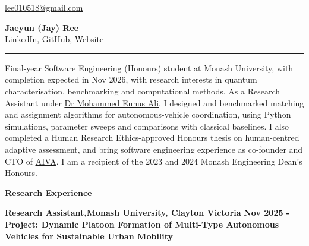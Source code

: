 \documentclass[11pt, a4paper]{article}
\let\hrefnoul\href
\renewcommand{\href}[2]{\hrefnoul{#1}{\ul{#2}}}
\newcommand{\resumesection}[1]{%
  \vspace{6pt}\par
  {\setlength{\fboxsep}{5pt}%
   \noindent\colorbox{sectionbg}{%
     \parbox{\dimexpr\linewidth-10pt\relax}{\strut\textbf{\large #1}\strut}%
   }}%
  \vspace{2pt}\par
}
\begin{document}

\noindent
\begin{minipage}[c]{0.25\textwidth}
  \href{mailto:lee010518@gmail.com}{lee010518@gmail.com}
\end{minipage}%
\begin{minipage}[c]{0.50\textwidth}
  \centering
  {\fontsize{26}{30}\selectfont\textbf{Jaeyun (Jay) Ree}}\\[3pt]
  \href{https://www.linkedin.com/in/jaeyun-ree-75b17b26b/}{LinkedIn},%
  \href{https://github.com/JayReeMarine/}{GitHub},%
  \href{https://jaeyunree.com/}{Website}%
\end{minipage}%
\begin{minipage}[c]{0.25\textwidth}
\end{minipage}

\vspace{4pt}
{\color{linkblue}\rule{\linewidth}{1.2pt}}
\vspace{2pt}

Final-year Software Engineering (Honours) student at Monash University, with completion expected in Nov 2026, with research interests in quantum characterisation, benchmarking and computational methods. As a Research Assistant under \href{https://research.monash.edu/en/persons/eunus-ali}{Dr Mohammed Eunus Ali}, I designed and benchmarked matching and assignment algorithms for autonomous-vehicle coordination, using Python simulations, parameter sweeps and comparisons with classical baselines. I also completed a Human Research Ethics-approved Honours thesis on human-centred adaptive assessment, and bring software engineering experience as co-founder and CTO of \href{https://github.com/AIVA-MVP}{AIVA}. I am a recipient of the 2023 and 2024 Monash Engineering Dean's Honours.

\resumesection{Research Experience}

\noindent\textbf{Research Assistant,\quad Monash University, Clayton Victoria}%
\hfill\textbf{Nov 2025 -}\\
\textbf{Project: Dynamic Platoon Formation of Multi-Type Autonomous Vehicles for Sustainable Urban Mobility}
\end{document}

